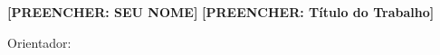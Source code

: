 \begin{folhaderosto}
  \begin{center}
    {\ABNTEXchapterfont\bfseries\large [PREENCHER: SEU NOME]}
    \vspace*{\fill}
    {\ABNTEXchapterfont\bfseries\large [PREENCHER: Título do Trabalho]}
    \vspace*{\fill}
    \hspace{.45\textwidth}
    \begin{minipage}{.5\textwidth}
      \SingleSpacing\imprimirpreambulo
      \par\vspace{1em}
      Orientador: \imprimirorientador
    \end{minipage}
    \vspace*{\fill}
    {\large\imprimirlocal}\\{\large\imprimirdata}
    \vspace*{1cm}
  \end{center}
\end{folhaderosto}
